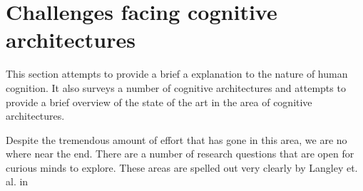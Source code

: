 

\section{Challenges facing cognitive architectures}

This section attempts to provide a brief a explanation to the nature
of human cognition. It also surveys a number of cognitive
architectures and attempts to provide a brief overview of the state of
the art in the area of cognitive architectures.

Despite the tremendous amount of effort that has gone in this area, we
are no where near the end. There are a number of research questions
that are open for curious minds to explore. These areas are spelled
out very clearly by Langley et. al. in \cite{citeulike:4182324}

